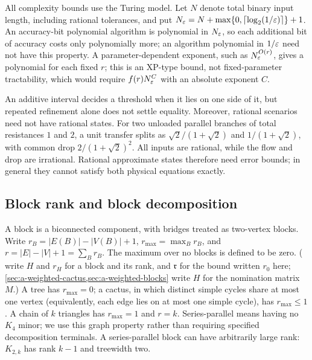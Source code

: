 All complexity bounds use the Turing model. Let $N$ denote total binary
input length, including rational tolerances, and put
$N_\varepsilon=N+\max\{0,\lceil\log_2(1/\varepsilon)\rceil\}+1$.
An accuracy-bit polynomial algorithm is polynomial in $N_\varepsilon$, so
each additional bit of accuracy costs only polynomially more; an
algorithm polynomial in $1/\varepsilon$ need not have this property.
A parameter-dependent exponent, such as $N_\varepsilon^{O(r)}$, gives a
polynomial for each fixed $r$; this is an XP-type bound, not
fixed-parameter tractability, which would require $f(r)N_\varepsilon^C$ with
an absolute exponent $C$.

An additive interval decides a threshold when it lies on one side of
it, but repeated refinement alone does not settle equality. Moreover,
rational scenarios need not have rational states. For two unloaded
parallel branches of total resistances $1$ and $2$, a unit transfer
splits as $\sqrt2/(1+\sqrt2)$ and $1/(1+\sqrt2)$, with common drop
$2/(1+\sqrt2)^2$. All inputs are rational, while the flow and drop
are irrational. Rational approximate states therefore need error
bounds; in general they cannot satisfy both physical equations exactly.

\subsection{Block rank and block decomposition}

A block is a biconnected component, with bridges treated as two-vertex
blocks. Write $r_B=|E(B)|-|V(B)|+1$,
$r_{\max}=\max_B r_B$, and
$r=|E|-|V|+1=\sum_B r_B$.
The maximum over no blocks is defined to be zero.
( write $H$
and $r_H$ for a block and its rank, and $\mathfrak r$ for the bound
written $r_0$ here; \cref{sec:a-weighted-cactus,sec:a-weighted-blocks}
write $H$ for the nomination matrix $M$.) A tree has $r_{\max}=0$; a cactus,
in which distinct simple cycles share at most one vertex (equivalently,
each edge lies on at most one simple cycle), has $r_{\max}\le1$. A chain of $k$ triangles has
$r_{\max}=1$ and $r=k$. Series-parallel means having no $K_4$ minor;
we use this graph property rather than requiring specified decomposition
terminals. A series-parallel block can have arbitrarily large rank:
$K_{2,k}$ has rank $k-1$ and treewidth two.

